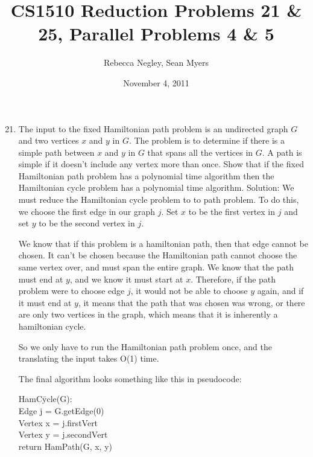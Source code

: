 \documentclass{article}
\title{CS1510  Reduction Problems 21 \& 25, Parallel Problems 4 \& 5}
\author{Rebecca Negley, Sean Myers}
\date{November 4, 2011}
\begin{document}
\maketitle

\begin{enumerate}
\setcounter{enumi}{20}
\item  The input to the fixed Hamiltonian path problem is an undirected graph $G$ and two vertices $x$ and $y$ in $G$. The problem is to determine if there is a simple path between $x$ and $y$ in $G$ that spans all the vertices in $G$. A path is simple if it doesn't include any vertex more than once. Show that if the fixed Hamiltonian path problem has a polynomial time algorithm then the Hamiltonian cycle problem has a polynomial time algorithm.
\newline
\newline Solution: We must reduce the Hamiltonian cycle problem to to path problem. To do this, we choose the first edge in our graph $j$. Set $x$ to be the first vertex in $j$ and set $y$ to be the second vertex in $j$. 

We know that if this problem is a hamiltonian path, then that edge cannot be chosen. It can't be chosen because the Hamiltonian path cannot choose the same vertex over, and must span the entire graph. We know that the path must end at $y$, and we know it must start at $x$. Therefore, if the path problem were to choose edge $j$, it would not be able to choose $y$ again, and if it must end at $y$, it means that the path that was chosen was wrong, or there are only two vertices in the graph, which means that it is inherently a hamiltonian cycle.

So we only have to run the Hamiltonian path problem once, and the translating the input takes O(1) time.

The final algorithm looks something like this in pseudocode:

\begin{tabbing}
HamC\=ycle(G):\\
\>Edge j = G.getEdge(0)\\
\>Vertex x = j.firstVert\\
\>Vertex y = j.secondVert\\
\>return HamPath(G, x, y)\\
\end{tabbing}


\end{enumerate}
\end{document}
